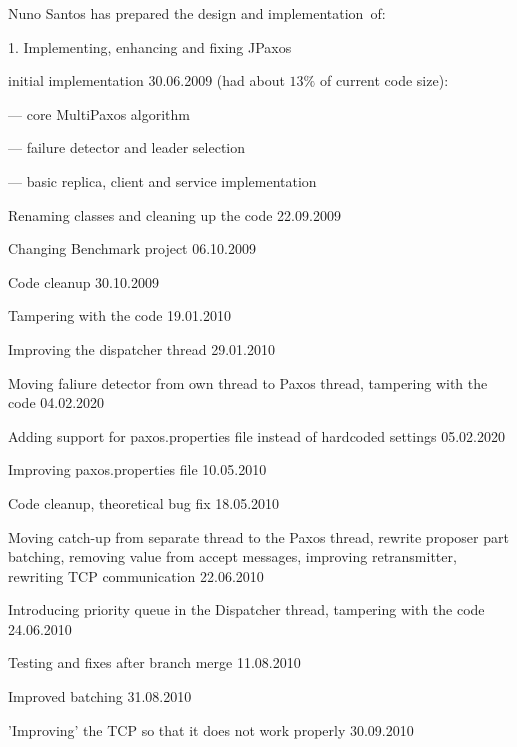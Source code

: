 \noindent Nuno Santos has prepared the design and implementation~of:
\begin{tightList}
 \item[1.] Implementing, enhancing and fixing JPaxos
  \begin{tightList}
    \item[\textbullet] initial implementation 30.06.2009 (had about $13\%$ of current code size):
    \begin{tightList}
      \item[---] core MultiPaxos algorithm
      \item[---] failure detector and leader selection
      \item[---] basic replica, client and service implementation
    \end{tightList}
    \item[\textbullet] Renaming classes and cleaning up the code 22.09.2009
    \item[\textbullet] Changing Benchmark project 06.10.2009
    \item[\textbullet] Code cleanup 30.10.2009
    \item[\textbullet] Tampering with the code 19.01.2010
    \item[\textbullet] Improving the dispatcher thread 29.01.2010
    \item[\textbullet] Moving faliure detector from own thread to Paxos thread, tampering with the code 04.02.2020
    \item[\textbullet] Adding support for paxos.properties file instead of hardcoded settings 05.02.2020
    \item[\textbullet] Improving paxos.properties file 10.05.2010
    \item[\textbullet] Code cleanup, theoretical bug fix 18.05.2010
    \item[\textbullet] Moving catch-up from separate thread to the Paxos thread, rewrite proposer part batching, removing value from accept messages, improving retransmitter, rewriting TCP communication 22.06.2010
    \item[\textbullet] Introducing priority queue in the Dispatcher thread, tampering with the code 24.06.2010
    \item[\textbullet] Testing and fixes after branch merge 11.08.2010
    \item[\textbullet] Improved batching 31.08.2010
    \item[\textbullet] 'Improving' the TCP so that it does not work properly 30.09.2010
  \end{tightList}


\end{tightList}
